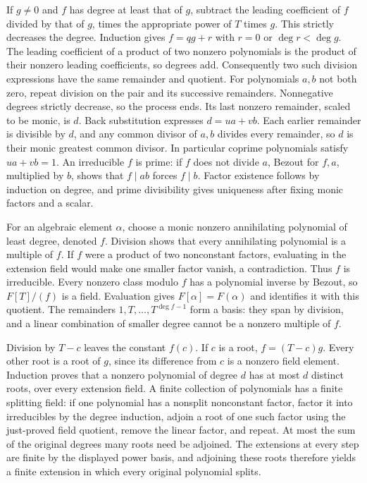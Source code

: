 \documentclass[11pt,a4paper,openany]{report}
\begin{document}
If \(g\ne0\) and \(f\) has degree at least that of \(g\), subtract the leading coefficient of \(f\) divided by that of \(g\), times the appropriate power of \(T\) times \(g\). This strictly decreases the degree. Induction gives \(f=qg+r\) with \(r=0\) or \(\deg r<\deg g\). The leading coefficient of a product of two nonzero polynomials is the product of their nonzero leading coefficients, so degrees add. Consequently two such division expressions have the same remainder and quotient. For polynomials \(a,b\) not both zero, repeat division on the pair and its successive remainders. Nonnegative degrees strictly decrease, so the process ends. Its last nonzero remainder, scaled to be monic, is \(d\). Back substitution expresses \(d=ua+vb\). Each earlier remainder is divisible by \(d\), and any common divisor of \(a,b\) divides every remainder, so \(d\) is their monic greatest common divisor. In particular coprime polynomials satisfy \(ua+vb=1\). An irreducible \(f\) is prime: if \(f\) does not divide \(a\), Bezout for \(f,a\), multiplied by \(b\), shows that \(f\mid ab\) forces \(f\mid b\). Factor existence follows by induction on degree, and prime divisibility gives uniqueness after fixing monic factors and a scalar.

For an algebraic element \(\alpha\), choose a monic nonzero annihilating polynomial of least degree, denoted \(f\). Division shows that every annihilating polynomial is a multiple of \(f\). If \(f\) were a product of two nonconstant factors, evaluating in the extension field would make one smaller factor vanish, a contradiction. Thus \(f\) is irreducible. Every nonzero class modulo \(f\) has a polynomial inverse by Bezout, so \(F[T]/(f)\) is a field. Evaluation gives \(F[\alpha]=F(\alpha)\) and identifies it with this quotient. The remainders \(1,T,\ldots,T^{\deg f-1}\) form a basis: they span by division, and a linear combination of smaller degree cannot be a nonzero multiple of \(f\).

Division by \(T-c\) leaves the constant \(f(c)\). If \(c\) is a root, \(f=(T-c)g\). Every other root is a root of \(g\), since its difference from \(c\) is a nonzero field element. Induction proves that a nonzero polynomial of degree \(d\) has at most \(d\) distinct roots, over every extension field. A finite collection of polynomials has a finite splitting field: if one polynomial has a nonsplit nonconstant factor, factor it into irreducibles by the degree induction, adjoin a root of one such factor using the just-proved field quotient, remove the linear factor, and repeat. At most the sum of the original degrees many roots need be adjoined. The extensions at every step are finite by the displayed power basis, and adjoining these roots therefore yields a finite extension in which every original polynomial splits.
\end{document}
